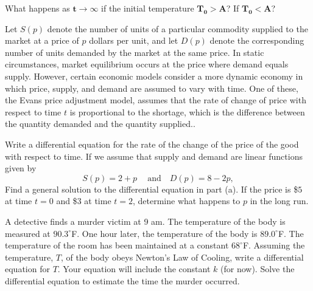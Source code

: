 \bb[resume]
\ii What happens as $\mathbf{t \to \infty}$ if the initial temperature $\mathbf{T_0>A}$? If $\mathbf{T_0 < A}$? \vfill



\clearpage


\ii %
Let $S(p)$ denote the number of units of a particular commodity supplied to the market at a price of $p$ dollars per unit, and let $D(p)$ denote the corresponding number of units demanded by the market at the same price.
\bi
\ii In static circumstances, market equilibrium occurs at the price where demand equals supply.
\ii However, certain economic models consider a more dynamic economy in which price, supply, and demand are assumed to vary with time.
\ii One of these, the Evans price adjustment model, assumes that the rate of change of price with respect to time $t$ is proportional to the shortage, which is the difference between the quantity demanded and the quantity supplied..
\ei

\bb
\ii Write a differential equation for the rate of the change of the price of the good with respect to time. \vspace{1in}
\ii If we assume that supply and demand are linear functions given by 
\[ S(p) = 2+p \ \ \ \ \mbox{ and } \ \ \ D(p)=8-2p, \]
Find a general solution to the differential equation in part (a). \vfill
\ii If the price is \$$5$ at time $t=0$ and \$$3$ at time $t=2$, determine what happens to $p$ in the long run. \vfill
\ee

\clearpage


\ii %
A detective finds a murder victim at 9 am. The temperature of the body
is measured at $90.3^{\circ}$F. One hour later, the
temperature of the body is $89.0^{\circ}$F. The
temperature of the room has been maintained at a constant
$68^{\circ}$F.
\bb
\ii Assuming the temperature, $T$, of the body obeys Newton's Law of
Cooling, write a differential equation for $T$. Your equation will include
the constant $k$ (for now). \vspace{1.25in}
\ii Solve the differential equation to estimate the time the murder occurred. \vfill
\ee
\ee
